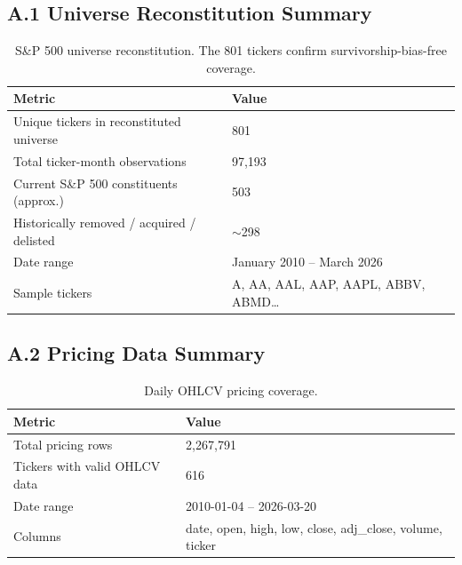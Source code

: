 \documentclass[11pt, a4paper]{article}
\begin{document}
\subsection*{A.1 Universe Reconstitution Summary}
\begin{table}[h]
\centering
\begin{tabular}{ll}
\toprule
\textbf{Metric} & \textbf{Value} \\
\midrule
Unique tickers in reconstituted universe & 801 \\
Total ticker-month observations & 97,193 \\
Current S\&P 500 constituents (approx.) & 503 \\
Historically removed / acquired / delisted & $\sim$298 \\
Date range & January 2010 -- March 2026 \\
Sample tickers & A, AA, AAL, AAP, AAPL, ABBV, ABMD\ldots \\
\bottomrule
\end{tabular}
\caption{S\&P 500 universe reconstitution. The 801 tickers confirm survivorship-bias-free coverage.}
\end{table}

\subsection*{A.2 Pricing Data Summary}
\begin{table}[h]
\centering
\begin{tabular}{ll}
\toprule
\textbf{Metric} & \textbf{Value} \\
\midrule
Total pricing rows & 2,267,791 \\
Tickers with valid OHLCV data & 616 \\
Date range & 2010-01-04 -- 2026-03-20 \\
Columns & date, open, high, low, close, adj\_close, volume, ticker \\
\bottomrule
\end{tabular}
\caption{Daily OHLCV pricing coverage.}
\end{table}
\end{document}
